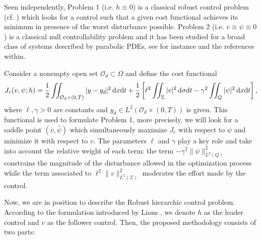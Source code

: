 \documentclass{aims}
\theoremstyle{definition}
\def\dx{\,\textnormal{d}x}
\def\dt{\textnormal{d}t}
\def\d{\,\textnormal{d}}
\begin{document}
Seen independently, Problem 1 (i.e. $h\equiv 0$) is a classical robust control problem (cf. \cite{temam,temam_nonlinear,aziz}) which looks for a control such that a given cost functional achieves its minimum in presence of the worst disturbance possible. Problem 2 (i.e. $v\equiv\psi\equiv 0$) is a classical null controllability problem and it has been studied for a broad class of systems described by parabolic PDEs, see for instance \cite{cara_guerrero} and the references within.

Consider a nonempty open set $\mathcal O_d\subset \Omega$ and define the cost functional
%
\begin{equation}\label{func_rob}
J_r(v,\psi;h)=\frac{1}{2}\iint_{\mathcal O_d\times(0,T)}|y-y_d|^2\dx\dt+\frac{1}{2}\left[\ell^2\iint_{\Sigma}|v|^2\d\sigma\dt-\gamma^2\iint_Q|\psi|^2\dx\dt\right],
\end{equation}
%
%
where $\ell,\gamma>0$ are constants and $y_d\in L^2(\mathcal O_d\times(0,T))$ is given. This functional is used to formulate  Problem 1, more precisely, we will look for a saddle point $(\bar v,\bar \psi)$ which simultaneously maximize $J_r$ with respect to $\psi$ and minimize it with respect to $v$. The parameters $\ell$ and $\gamma$ play a key role and take into account the relative weight of each term: the term $-\gamma^2\|\psi\|^2_{L^2(Q)}$ constrains the magnitude of the disturbance allowed in the optimization process while the term associated to $\ell^2\|v\|^2_{L^2(\Sigma)}$ moderates the effort made by the control. 

Now, we are in position to describe the Robust hierarchic control problem. According to the formulation introduced by Lions \cite{LionsSta}, we denote $h$ as the leader control and $v$ as the follower control. Then, the proposed methodology consists of two parts:
\end{document}

